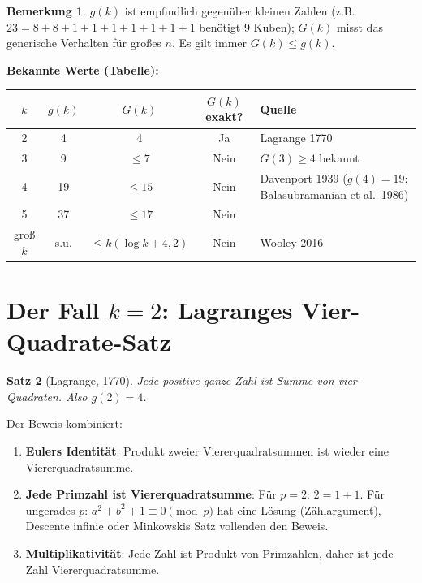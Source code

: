 \documentclass[12pt,a4paper]{amsart}
\newtheorem{theorem}{Satz}[section]
\theoremstyle{definition}
\newtheorem{bemerkung}[theorem]{Bemerkung}
\begin{document}
\begin{bemerkung}
  $g(k)$ ist empfindlich gegenüber kleinen Zahlen (z.B.\ $23 = 8+8+1+1+1+1+1+1+1$
  benötigt 9 Kuben); $G(k)$ misst das generische Verhalten für großes $n$.
  Es gilt immer $G(k) \leq g(k)$.
\end{bemerkung}

\textbf{Bekannte Werte (Tabelle):}

\begin{center}
\begin{tabular}{ccccl}
\toprule
$k$ & $g(k)$ & $G(k)$ & $G(k)$ exakt? & Quelle \\
\midrule
2 & 4 & 4 & Ja & Lagrange 1770 \\
3 & 9 & $\leq 7$ & Nein & $G(3) \geq 4$ bekannt \\
4 & 19 & $\leq 15$ & Nein & Davenport 1939 ($g(4){=}19$: Balasubramanian et al.\ 1986) \\
5 & 37 & $\leq 17$ & Nein & \\
groß $k$ & s.u. & $\leq k(\log k+4{,}2)$ & Nein & Wooley 2016 \\
\bottomrule
\end{tabular}
\end{center}

\section{Der Fall $k=2$: Lagranges Vier-Quadrate-Satz}
\label{sec:quadrate}

\begin{theorem}[Lagrange, 1770]\label{thm:lagrange}
  Jede positive ganze Zahl ist Summe von vier Quadraten.  Also $g(2) = 4$.
\end{theorem}

Der Beweis kombiniert:
\begin{enumerate}
  \item \textbf{Eulers Identität}: Produkt zweier Viererquadratsummen ist
    wieder eine Viererquadratsumme.
  \item \textbf{Jede Primzahl ist Viererquadratsumme}: Für $p=2$: $2=1+1$.
    Für ungerades $p$: $a^2 + b^2 + 1 \equiv 0 \pmod p$ hat eine Lösung
    (Zählargument), Descente infinie oder Minkowskis Satz vollenden den Beweis.
  \item \textbf{Multiplikativität}: Jede Zahl ist Produkt von Primzahlen,
    daher ist jede Zahl Viererquadratsumme.
\end{enumerate}
\end{document}
